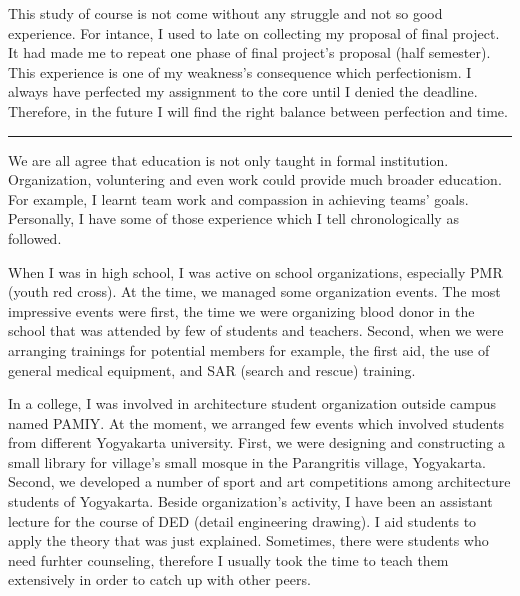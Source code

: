 \documentclass[11pt]{simart} %
\begin{document}
This study of course is not come without any struggle and not so good experience. For intance, I used to late on collecting my proposal of final project. It had made me to repeat one phase of final project's proposal (half semester). This experience is one of my weakness's consequence which perfectionism. I always have perfected my assignment to the core until I denied the deadline. Therefore, in the future I will find the right balance between perfection and time.

\noindent\rule{\linewidth}{0.5pt}
We are all agree that education is not only taught in formal institution. Organization, voluntering and even work could provide much broader education. For example, I learnt team work and compassion in achieving teams' goals. Personally, I have some of those experience which I tell chronologically as followed.

When I was in high school, I was active on school organizations, especially PMR (youth red cross). At the time, we managed some organization events. The most impressive events were first, the time we were organizing blood donor in the school that was attended by few of students and teachers. Second, when we were arranging trainings for potential members for example, the first aid, the use of general medical equipment, and SAR (search and rescue) training.

In a college, I was involved in architecture student organization outside campus named PAMIY. At the moment, we arranged few events which involved students from different Yogyakarta university. First, we were designing and constructing a small library for village's small mosque in the Parangritis village, Yogyakarta. Second, we developed a number of sport and art competitions among architecture students of Yogyakarta. Beside organization's activity, I have been an assistant lecture for the course of DED (detail engineering drawing). I aid students to apply the theory that was just explained. Sometimes, there were  students who need furhter counseling, therefore I usually took the time to teach them extensively in order to catch up with other peers.
\end{document}
